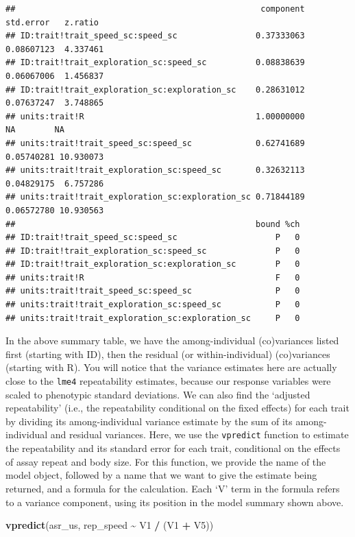 \documentclass[
  12pt,
]{book}
\newenvironment{Shaded}{\begin{snugshade}}{\end{snugshade}}
\newcommand{\KeywordTok}[1]{\textcolor[rgb]{0.13,0.29,0.53}{\textbf{#1}}}
\newcommand{\NormalTok}[1]{#1}
\newcommand{\OperatorTok}[1]{\textcolor[rgb]{0.81,0.36,0.00}{\textbf{#1}}}
\newcommand{\StringTok}[1]{\textcolor[rgb]{0.31,0.60,0.02}{#1}}
\begin{document}
\begin{verbatim}
##                                                  component  std.error   z.ratio
## ID:trait!trait_speed_sc:speed_sc                0.37333063 0.08607123  4.337461
## ID:trait!trait_exploration_sc:speed_sc          0.08838639 0.06067006  1.456837
## ID:trait!trait_exploration_sc:exploration_sc    0.28631012 0.07637247  3.748865
## units:trait!R                                   1.00000000         NA        NA
## units:trait!trait_speed_sc:speed_sc             0.62741689 0.05740281 10.930073
## units:trait!trait_exploration_sc:speed_sc       0.32632113 0.04829175  6.757286
## units:trait!trait_exploration_sc:exploration_sc 0.71844189 0.06572780 10.930563
##                                                 bound %ch
## ID:trait!trait_speed_sc:speed_sc                    P   0
## ID:trait!trait_exploration_sc:speed_sc              P   0
## ID:trait!trait_exploration_sc:exploration_sc        P   0
## units:trait!R                                       F   0
## units:trait!trait_speed_sc:speed_sc                 P   0
## units:trait!trait_exploration_sc:speed_sc           P   0
## units:trait!trait_exploration_sc:exploration_sc     P   0
\end{verbatim}

In the above summary table, we have the among-individual (co)variances listed first (starting with ID), then the residual (or within-individual) (co)variances (starting with R). You will notice that the variance estimates here are actually close to the \texttt{lme4} repeatability estimates, because our response variables were scaled to phenotypic standard deviations. We can also find the `adjusted repeatability' (i.e., the repeatability conditional on the fixed effects) for each trait by dividing its among-individual variance estimate by the sum
of its among-individual and residual variances.
Here, we use the \texttt{vpredict} function to estimate the repeatability and its
standard error for each trait, conditional on the effects of assay repeat and body size.
For this function, we provide the name of the model object, followed by a name that we want to give the estimate being returned, and a formula for the calculation. Each `V' term in the formula refers to a variance component, using its position in the model summary shown above.

\begin{Shaded}
\begin{Highlighting}[]
\KeywordTok{vpredict}\NormalTok{(asr\_us, rep\_speed }\OperatorTok{\textasciitilde{}}\StringTok{ }\NormalTok{V1 }\OperatorTok{/}\StringTok{ }\NormalTok{(V1 }\OperatorTok{+}\StringTok{ }\NormalTok{V5))}
\end{Highlighting}
\end{Shaded}
\end{document}
